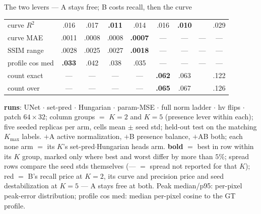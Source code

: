 \begin{frame}{The two levers --- A stays free; B costs recall, then the curve}
\begin{tabular}{@{}l cc !{\hspace{2pt}} cc !{\hspace{8pt}} cc !{\hspace{2pt}} cc@{}}
    curve $R^2$ & .016 & .017 & \textbf{.011} & .014 & .016 & \textbf{.010} &  & .029 \\
    curve MAE & .0011 & .0008 & .0008 & \textbf{.0007} & --- & --- & --- & --- \\
    SSIM range & .0028 & .0025 & .0027 & \textbf{.0018} & --- & --- & --- & --- \\
    profile cos med & \textbf{.033} & .042 & .038 & .035 & --- & --- & --- & --- \\
    count exact & --- & --- & --- & --- & \textbf{.062} & .063 &  & .122 \\
    count over & --- & --- & --- & --- & \textbf{.065} & .067 &  & .126 \\
    \bottomrule
  \end{tabular}
  \par\vspace{3pt}
  \parbox{0.94\textwidth}{\tiny\color{soft} \textbf{runs}: UNet $\cdot$ set-pred $\cdot$ Hungarian $\cdot$ param-MSE $\cdot$ full norm ladder $\cdot$ hv flips $\cdot$ patch $64{\times}32$; column groups $=$ $K{=}2$ and $K{=}5$ (presence lever within each); five seeded replicas per arm, cells mean $\pm$ seed std; held-out test on the matching $K_{\max}$ labels. $+$A active normalization, $+$B presence balance, $+$AB both; each none arm $=$ its $K$'s set-pred$\cdot$Hungarian heads arm. \textbf{bold} $=$ best in row within its $K$ group, marked only where best and worst differ by more than $5\%$; spread rows compare the seed stds themselves (--- $=$ spread not reported for that $K$); \textcolor{accent}{red} $=$ B's recall price at $K{=}2$, its curve and precision price and seed destabilization at $K{=}5$ --- A stays free at both. Peak median/p95: per-pixel peak-error distribution; profile cos med: median per-pixel cosine to the GT profile.\par}
\end{frame}

